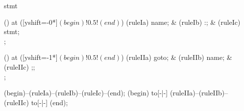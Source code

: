\begin{syntax}{stmt}
  
  \node[sequence] () at ([yshift=-0*\syntaxruledist]$(begin)!0.5!(end)$) {
    \node[nonterminal] (ruleIa) {name};
    &
    \node[terminal]    (ruleIb) {:};
    &
    \node[nonterminal] (ruleIc) {stmt};
    \\
  };
  
  \node[sequence] () at ([yshift=-1*\syntaxruledist]$(begin)!0.5!(end)$) {
    \node[terminal]    (ruleIIa) {goto};
    &
    \node[nonterminal] (ruleIIb) {name};
    &
    \node[terminal]    (ruleIIc) {;};
    \\
  };
  
  \draw[path] (begin)--(ruleIa)--(ruleIb)--(ruleIc)--(end);
  \draw[path] (begin) to[-|-] (ruleIIa)--(ruleIIb)--(ruleIIc) to[-|-] (end);
\end{syntax}
